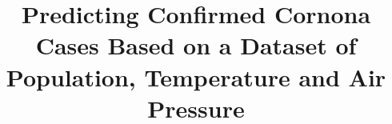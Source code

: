 

\subject{Machine Learning for Physicists}
\title{Predicting Confirmed Cornona Cases Based on a Dataset of Population, Temperature and Air Pressure}



\maketitle
\thispagestyle{empty}
\tableofcontents
\newpage

%
%
%





\newpage

\printbibliography{}
\newpage
\begin{appendices}

\end{appendices}


